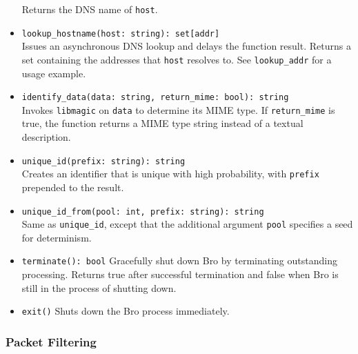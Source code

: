 \documentclass[10pt,landscape]{article}
\newcommand{\verbose}[1]{#1}
\newcommand{\verbose}[1]{}
\begin{document}
\begin{multicols*}{2}
\begin{itemize}
    Returns the DNS name of \verb|host|.
  \item \verb|lookup_hostname(host: string): set[addr]|\\
    Issues an asynchronous DNS lookup and delays the function result.
    Returns a set containing the addresses that \verb|host| resolves to.
    See \verb|lookup_addr| for a usage example.
  \item \verb|identify_data(data: string, return_mime: bool): string|\\
    Invokes \texttt{libmagic} on \verb|data| to determine its MIME type. If
    \verb|return_mime| is true, the function returns a MIME type string instead
    of a textual description.
  \item \verb|unique_id(prefix: string): string|\\
    Creates an identifier that is unique with high probability, with
    \verb|prefix| prepended to the result.
  \item \verb|unique_id_from(pool: int, prefix: string): string|\\
    Same as \verb|unique_id|, except that the additional argument \verb|pool|
    specifies a seed for determinism.
  \item \verb|terminate(): bool|
    Gracefully shut down Bro by terminating outstanding processing. Returns
    true after successful termination and false when Bro is still in the
    process of shutting down.
  \item \verb|exit()|
    Shuts down the Bro process immediately.
\end{itemize}

\verbose{
\subsubsection*{Packet Filtering}

}
\end{multicols*}
\end{document}
